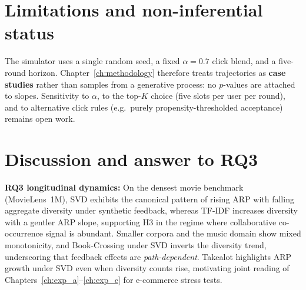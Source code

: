 \section{Limitations and non-inferential status}
The simulator uses a single random seed, a fixed $\alpha=0.7$ click blend, and a five-round horizon. Chapter~\ref{ch:methodology} therefore treats trajectories as \textbf{case studies} rather than samples from a generative process: no $p$-values are attached to slopes. Sensitivity to $\alpha$, to the top-$K$ choice (five slots per user per round), and to alternative click rules (e.g.\ purely propensity-thresholded acceptance) remains open work.

\section{Discussion and answer to RQ3}
\textbf{RQ3 longitudinal dynamics:} On the densest movie benchmark (MovieLens~1M), SVD exhibits the canonical pattern of rising ARP with falling aggregate diversity under synthetic feedback, whereas TF-IDF increases diversity with a gentler ARP slope, supporting H3 in the regime where collaborative co-occurrence signal is abundant. Smaller corpora and the music domain show mixed monotonicity, and Book-Crossing under SVD inverts the diversity trend, underscoring that feedback effects are \emph{path-dependent}. Takealot highlights ARP growth under SVD even when diversity counts rise, motivating joint reading of Chapters~\ref{ch:exp_a}--\ref{ch:exp_c} for e-commerce stress tests.
